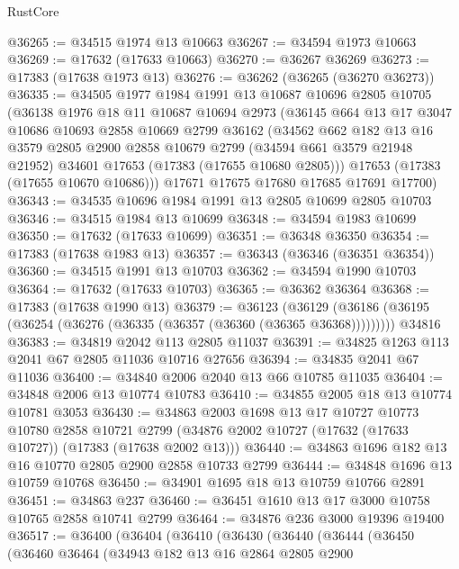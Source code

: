 \begin{lexlean}{RustCore}
\begin{coremodule}
@36265 := @34515 @1974 @13 @10663
@36267 := @34594 @1973 @10663
@36269 := @17632 (@17633 @10663)
@36270 := @36267 @36269
@36273 := @17383 (@17638 @1973 @13)
@36276 := @36262 (@36265 (@36270 @36273))
@36335 := @34505
    @1977
    @1984
    @1991
    @13
    @10687
    @10696
    @2805
    @10705
    (@36138
      @1976
      @18
      @11
      @10687
      @10694
      @2973
      (@36145
        @664
        @13
        @17
        @3047
        @10686
        @10693
        @2858
        @10669
        @2799
        @36162
        (@34562
          @662
          @182
          @13
          @16
          @3579
          @2805
          @2900
          @2858
          @10679
          @2799
          (@34594 @661 @3579 @21948 @21952)
          @34601
          @17653
          (@17383 (@17655 @10680 @2805)))
        @17653
        (@17383 (@17655 @10670 @10686)))
      @17671
      @17675
      @17680
      @17685
      @17691
      @17700)
@36343 := @34535 @10696 @1984 @1991 @13 @2805 @10699 @2805 @10703
@36346 := @34515 @1984 @13 @10699
@36348 := @34594 @1983 @10699
@36350 := @17632 (@17633 @10699)
@36351 := @36348 @36350
@36354 := @17383 (@17638 @1983 @13)
@36357 := @36343 (@36346 (@36351 @36354))
@36360 := @34515 @1991 @13 @10703
@36362 := @34594 @1990 @10703
@36364 := @17632 (@17633 @10703)
@36365 := @36362 @36364
@36368 := @17383 (@17638 @1990 @13)
@36379 := @36123
    (@36129 (@36186 (@36195 (@36254 (@36276 (@36335 (@36357 (@36360 (@36365 @36368)))))))))
    @34816
@36383 := @34819 @2042 @113 @2805 @11037
@36391 := @34825 @1263 @113 @2041 @67 @2805 @11036 @10716 @27656
@36394 := @34835 @2041 @67 @11036
@36400 := @34840 @2006 @2040 @13 @66 @10785 @11035
@36404 := @34848 @2006 @13 @10774 @10783
@36410 := @34855 @2005 @18 @13 @10774 @10781 @3053
@36430 := @34863
    @2003
    @1698
    @13
    @17
    @10727
    @10773
    @10780
    @2858
    @10721
    @2799
    (@34876 @2002 @10727 (@17632 (@17633 @10727)) (@17383 (@17638 @2002 @13)))
@36440 := @34863 @1696 @182 @13 @16 @10770 @2805 @2900 @2858 @10733 @2799
@36444 := @34848 @1696 @13 @10759 @10768
@36450 := @34901 @1695 @18 @13 @10759 @10766 @2891
@36451 := @34863 @237
@36460 := @36451 @1610 @13 @17 @3000 @10758 @10765 @2858 @10741 @2799
@36464 := @34876 @236 @3000 @19396 @19400
@36517 := @36400
    (@36404
      (@36410
        (@36430
          (@36440
            (@36444
              (@36450
                (@36460
                  @36464
                  (@34943
                    @182
                    @13
                    @16
                    @2864
                    @2805
                    @2900

\end{coremodule}
\end{lexlean}
